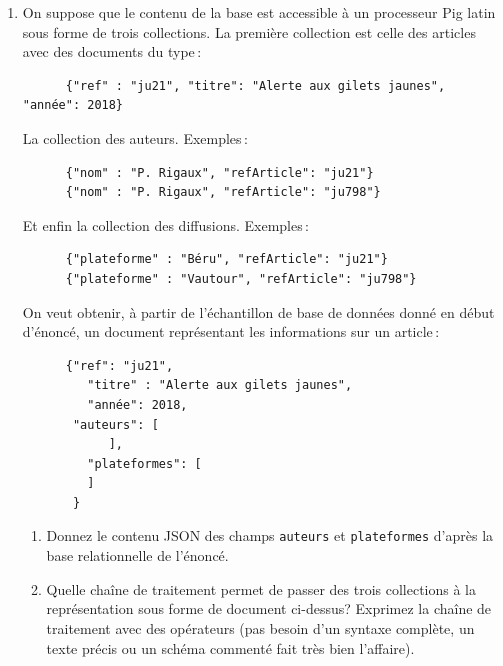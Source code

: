 \documentclass[11pt,a4paper]{article}
\begin{document}
\begin{enumerate}
  \item On suppose que le contenu de la base  est accessible à un processeur
    Pig latin sous forme de trois collections. La première collection est celle
    des articles avec des documents du type\,:
    \begin{small}
    \begin{verbatim}
      {"ref" : "ju21", "titre": "Alerte aux gilets jaunes", "année": 2018}
    \end{verbatim}
    \end{small}
    La collection des auteurs. Exemples\,:
    \begin{small}
        \begin{verbatim}
      {"nom" : "P. Rigaux", "refArticle": "ju21"}
      {"nom" : "P. Rigaux", "refArticle": "ju798"}
    \end{verbatim}
    \end{small}
    Et enfin la collection des diffusions. Exemples\,:
    \begin{small}
     \begin{verbatim}
      {"plateforme" : "Béru", "refArticle": "ju21"}
      {"plateforme" : "Vautour", "refArticle": "ju798"}
    \end{verbatim}
    \end{small}
     
    On veut obtenir, à partir 
    de l'échantillon de base de données donné en début d'énoncé, un document
    représentant les informations sur un article\,:

    
    \begin{small}
    \begin{verbatim}
      {"ref": "ju21",
         "titre" : "Alerte aux gilets jaunes",
         "année": 2018,
       "auteurs": [
            ],
         "plateformes": [
         ]
       }
    \end{verbatim}
    \end{small}
    
    
    \begin{enumerate}
      \item Donnez le contenu JSON des champs \texttt{auteurs} et \texttt{plateformes}
          d'après la base relationnelle de l'énoncé.
          
     \item Quelle chaîne de traitement permet de passer des trois collections
         à la représentation sous forme de document ci-dessus? Exprimez 
         la chaîne de traitement avec des opérateurs (pas besoin d'un syntaxe complète,
         un texte précis ou un schéma commenté
         fait très bien l'affaire).
      

\end{enumerate}
\end{enumerate}
\end{document}

